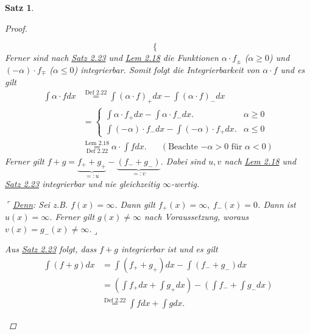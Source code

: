 \documentclass[a4paper]{scrreprt}
\newcommand{\jemph}{\uline}
\newcommand{\jshortlink}[1]{\jhyperref{#1}{\text{#1}}}
\newcommand{\jhyperref}[2]{\hyperref[j_#1]{#2}}
\newcommand{\jlink}[1]{\jhyperref{#1}{#1}}
\newcommand{\jspacesmall}{\vspace{4pt}}
\theoremstyle{plain}
\newtheorem{satz}[thm]{Satz}
\theoremstyle{definition}
\begin{document}
{{{{\begin{satz}
\begin{proof}
\begin{enumerate}
\begin{displaymath}
\begin{cases}
                                          \end{cases}
                \end{displaymath}
                Ferner sind nach \jlink{Satz 2.23} und \jlink{Lem 2.18} die Funktionen $\alpha\cdot f_\pm$ ($\alpha \ge 0$) und $(-\alpha)\cdot f_\mp$ ($\alpha \le 0$) integrierbar. Somit folgt die Integrierbarkeit von $\alpha\cdot f$ und es gilt
                \begin{displaymath}
                    \begin{split}
                        \int \alpha\cdot f dx &\overset{\jshortlink{Def 2.22}}{=} \int (\alpha\cdot f)_+ dx - \int (\alpha\cdot f)_-dx\\
                        &= \begin{cases}
                               \int \alpha\cdot f_+ dx - \int \alpha \cdot f_- dx. &\alpha \ge 0\\
                               \int (-\alpha)\cdot f_-dx - \int (-\alpha)\cdot f_+dx. &\alpha \le 0
                           \end{cases}\\
                        &\overset{\jshortlink{Lem 2.18}}{\underset{\jshortlink{Def 2.22}}{=}} \alpha\cdot \int fdx. \hspace{20pt} (\text{Beachte $-\alpha > 0$ für $\alpha < 0$})
                    \end{split}
                \end{displaymath}
                Ferner gilt $f+g = \underbrace{f_+ + g_+}_{=:u} - \underbrace{(f_- + g_-)}_{=:v}$. Dabei sind $u,v$ nach \jlink{Lem 2.18} und \jlink{Satz 2.23} integrierbar und nie gleichzeitig $\infty$-wertig.
                
                \jspacesmall
                
                $\ulcorner$\jemph{Denn}: Sei z.B. $f(x)=\infty$. Dann gilt $f_+(x)=\infty, \ f_-(x)=0$. Dann ist $u(x) =\infty$. Ferner gilt $g(x)\ne \infty$ nach Voraussetzung, woraus $v(x) = g_-(x) \ne \infty$.$\lrcorner$
                
                \jspacesmall
                
                Aus \jlink{Satz 2.23} folgt, dass $f+g$ integrierbar ist und es gilt
                \begin{displaymath}
                    \begin{split}
                        \int(f+g)dx &= \int(f_+ + g_+)dx - \int(f_- + g_-)dx\\
                        &= \left(\int f_+dx + \int g_+dx \right) - \left(\int f_- + \int g_- dx \right)\\
                        &\overset{\jshortlink{Def 2.22}}{=} \int f dx + \int g dx.
                    \end{split}
                \end{displaymath}
                

\end{enumerate}
\end{proof}
\end{satz}}}}}
\end{document}

